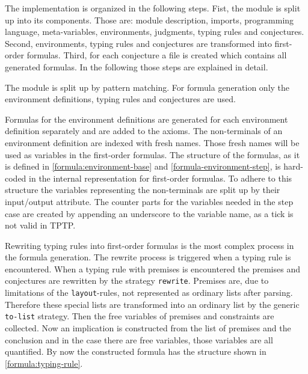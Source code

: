The implementation is organized in the following steps. Fist, the
module is split up into its components. Those are: module description,
imports, programming language, meta-variables, environments,
judgments, typing rules and conjectures. Second, environments, typing
rules and conjectures are transformed into first-order
formulas. Third, for each conjecture a file is created which contains
all generated formulas. In the following those steps are explained in
detail.

The module is split up by pattern matching. For formula generation
only the environment definitions, typing rules and conjectures are
used.

Formulas for the environment definitions are generated for each
environment definition separately and are added to the axioms. The
non-terminals of an environment definition are indexed with fresh
names. Those fresh names will be used as variables in the first-order
formulas. The structure of the formulas, as it is defined in
\ref{formula:environment-base} and \ref{formula-environment-step}, is
hard-coded in the internal representation for first-order formulas. To
adhere to this structure the variables representing the non-terminals
are split up by their input/output attribute. The counter parts for
the variables needed in the step case are created by appending an
underscore to the variable name, as a tick is not valid in TPTP.

Rewriting typing rules into first-order formulas is the most complex
process in the formula generation. The rewrite process is triggered
when a typing rule is encountered. When a typing rule with premises is
encountered the premises and conjectures are rewritten by the strategy
\texttt{rewrite}. Premises are, due to limitations of the
\texttt{layout}-rules, not represented as ordinary lists after
parsing. Therefore these special lists are transformed into an
ordinary list by the generic \texttt{to-list} strategy. Then the
free variables of premises and constraints are collected. Now an
implication is constructed from the list of premises and the
conclusion and in the case there are free variables, those variables
are all quantified. By now the constructed formula has the structure
shown in \ref{formula:typing-rule}.

